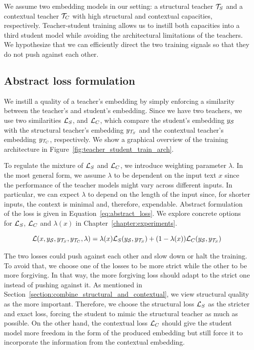 We assume two embedding models in our setting: a structural teacher
$\mathcal{T}_S$ and a contextual teacher $\mathcal{T}_C$ with high structural and
contextual capacities, respectively. Teacher-student training allows us to
instill both capacities into a third student model {\Student} while avoiding
the architectural limitations of the teachers. We hypothesize that we can
efficiently direct the two training signals so that they do not push against
each other.


\subsection{Abstract loss formulation}\label{section:abstract_loss}


We instill a quality of a teacher's embedding by simply enforcing a similarity
between the teacher's and student's embedding. Since we have two teachers, we
use two similarities $\mathcal{L}_S$, and $\mathcal{L}_C$, which compare the student's
embedding $y_{\mathcal{S}}$ with the structural teacher's embedding $y_{\mathcal{T}_S}$
and the contextual teacher's embedding $y_{\mathcal{T}_C}$, respectively. We show
a graphical overview of the training architecture in
Figure~\ref{fig:teacher_student_train_arch}.

To regulate the mixture of $\mathcal{L}_S$ and $\mathcal{L}_C$, we introduce weighting
parameter $\lambda$. In the most general form, we assume $\lambda$ to be
dependent on the input text $x$ since the performance of the teacher models
might vary across different inputs. In particular, we can expect $\lambda$ to
depend on the length of the input since, for shorter inputs, the context
is minimal and, therefore, expendable. Abstract formulation of the loss is
given in Equation~\ref{eq:abstract_loss}. We explore concrete options for
$\mathcal{L}_S$, $\mathcal{L}_C$ and $\lambda(x)$ in Chapter~\ref{chapter:experiments}.

\begin{equation}\label{eq:abstract_loss}
  \mathcal{L}(
    x,
    y_{\mathcal{S}},
    y_{\mathcal{T}_S},
    y_{\mathcal{T}_C},
    \lambda
  ) =
    \lambda(x) \mathcal{L}_S(y_{\mathcal{S}}, y_{\mathcal{T}_S}) +
            (1 - \lambda(x)) \mathcal{L}_C(y_{\mathcal{S}}, y_{\mathcal{T}_S})
\end{equation}

The two losses could push against each other and slow down or halt the
training. To avoid that, we choose one of the losses to be more strict while
the other to be more forgiving. In that way, the more forgiving loss should
adapt to the strict one instead of pushing against it. As mentioned in
Section~\ref{section:combine_structural_and_contextual}, we view structural
quality as the more important. Therefore, we choose the structural loss
$\mathcal{L}_S$ as the stricter and exact loss, forcing the student to mimic the
structural teacher as much as possible. On the other hand, the contextual loss
$\mathcal{L}_C$ should give the student model more freedom in the form of the
produced embedding but still force it to incorporate the information from the
contextual embedding.

